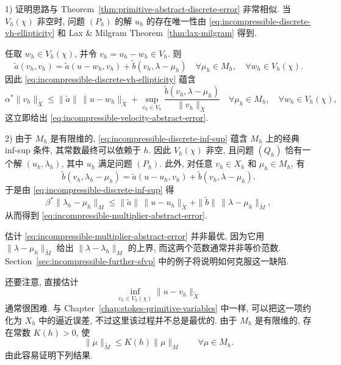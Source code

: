 \begin{Proof}
\textup{1)} 证明思路与
Theorem~\ref{thm:primitive-abstract-discrete-error} 非常相似.
当 $V_h(\chi)$ 非空时, 问题 $(P_h)$ 的解 $u_h$
的存在唯一性由
\eqref{eq:incompressible-discrete-vh-ellipticity}
和 Lax \& Milgram Theorem~\ref{thm:lax-milgram} 得到.

任取 $w_h\in V_h(\chi)$, 并令
$v_h=u_h-w_h\in V_h$.
则
\[
\widetilde a(v_h,v_h)
=\widetilde a(u-w_h,v_h)
+\widetilde b(v_h,\lambda-\mu_h)
\quad
\forall\mu_h\in M_h,\quad
\forall w_h\in V_h(\chi).
\]
因此 \eqref{eq:incompressible-discrete-vh-ellipticity} 蕴含
\[
\alpha^*\|v_h\|_{\widetilde X}
\leq
\|\widetilde a\|\,\|u-w_h\|_{\widetilde X}
+
\sup_{v_h\in V_h}
\frac{\widetilde b(v_h,\lambda-\mu_h)}
{\|v_h\|_{\widetilde X}}
\quad
\forall\mu_h\in M_h,\quad
\forall w_h\in V_h(\chi),
\]
这立即给出 \eqref{eq:incompressible-velocity-abstract-error}.

\textup{2)} 由于 $M_h$ 是有限维的,
\eqref{eq:incompressible-discrete-inf-sup}
蕴含 $M_h$ 上的经典 inf-sup 条件,
其常数最终可以依赖于 $h$.
因此 $V_h(\chi)$ 非空, 且问题 $(Q_h)$ 恰有一个解
$(u_h,\lambda_h)$, 其中 $u_h$ 满足问题 $(P_h)$.
此外, 对任意 $v_h\in X_h$ 和 $\mu_h\in M_h$, 有
\begin{equation}\label{eq:incompressible-discrete-multiplier-identity}
\widetilde b(v_h,\lambda_h-\mu_h)
=\widetilde a(u-u_h,v_h)
+\widetilde b(v_h,\lambda-\mu_h).
\end{equation}
于是由 \eqref{eq:incompressible-discrete-inf-sup} 得
\[
\beta^*\|\lambda_h-\mu_h\|_M
\leq
\|\widetilde a\|\,\|u-u_h\|_{\widetilde X}
+\|\widetilde b\|\,\|\lambda-\mu_h\|_{\widetilde M},
\]
从而得到
\eqref{eq:incompressible-multiplier-abstract-error}.
\end{Proof}

估计 \eqref{eq:incompressible-multiplier-abstract-error} 并非最优,
因为它用 $\|\lambda-\mu_h\|_{\widetilde M}$
给出 $\|\lambda-\lambda_h\|_M$ 的上界,
而这两个范数通常并非等价范数.
Section~\ref{sec:incompressible-further-sfvp}
中的例子将说明如何克服这一缺陷.

还要注意, 直接估计
\[
\inf_{v_h\in V_h(\chi)}
\|u-v_h\|_{\widetilde X}
\]
通常很困难.
与 Chapter~\ref{chap:stokes-primitive-variables} 中一样,
可以把这一项约化为 $X_h$ 中的逼近误差,
不过这里该过程并不总是最优的.
由于 $M_h$ 是有限维的, 存在常数 $K(h)>0$, 使
\begin{equation}\label{eq:incompressible-mh-norm-comparison}
\|\mu\|_{\widetilde M}
\leq K(h)\|\mu\|_M
\qquad\forall\mu\in M_h.
\end{equation}
由此容易证明下列结果.

